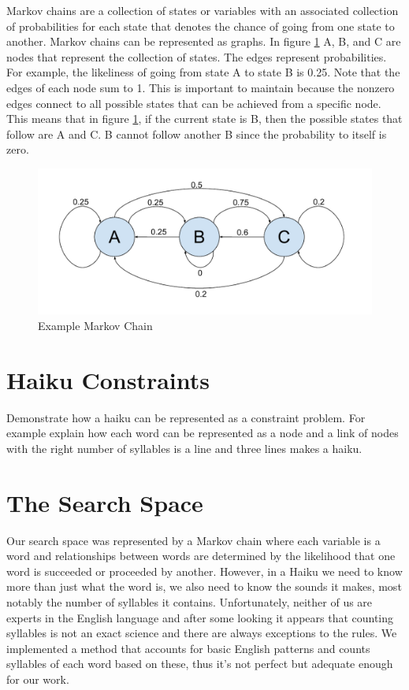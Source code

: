 \documentclass[]{article}
\begin{document}
Markov chains are a collection of states or variables with an associated collection of probabilities for each state that denotes the chance of going from one state to another. Markov chains can be represented as graphs. In figure \ref{fig:Chain} A, B, and C are nodes that represent the collection of states. The edges represent probabilities. For example, the likeliness of going from state A to state B is 0.25. Note that the edges of each node sum to 1. This is important to maintain because the nonzero edges connect to all possible states that can be achieved from a specific node. This means that in figure \ref{fig:Chain}, if the current state is B, then the possible states that follow are A and C. B cannot follow another B since the probability to itself is zero. \cite{Markov}

\begin{figure}[H]
	\centering
	\includegraphics[width=1\textwidth]{MarkovChainExample}
	\caption{Example Markov Chain}
	\label{fig:Chain}
\end{figure}

\section{Haiku Constraints}
Demonstrate how a haiku can be represented as a constraint problem. For example explain how each word can be represented as a node and a link of nodes with the right number of syllables is a line and three lines makes a haiku.

\section{The Search Space}
Our search space was represented by a Markov chain where each variable is a word and relationships between words are determined by the likelihood that one word is succeeded or proceeded by another. However, in a Haiku we need to know more than just what the word is, we also need to know the sounds it makes, most notably the number of syllables it contains. Unfortunately, neither of us are experts in the English language and after some looking it appears that counting syllables is not an exact science and there are always exceptions to the rules. We implemented a method that accounts for basic English patterns and counts syllables of each word based on these, thus it's not perfect but adequate enough for our work.
\end{document}
